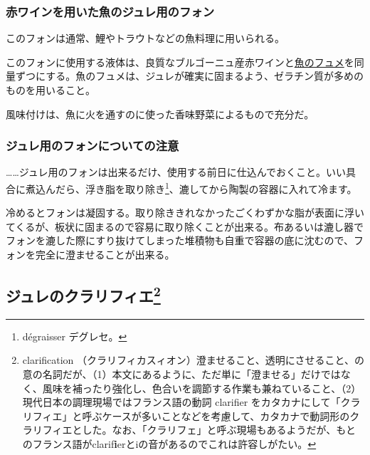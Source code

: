 \begin{recette}
\atoaki{}

\hypertarget{fonds-pour-gelee-de-poisson-au-vin-rouge}{%
\subsubsection{赤ワインを用いた魚のジュレ用のフォン}\label{fonds-pour-gelee-de-poisson-au-vin-rouge}}



このフォンは通常、鯉やトラウトなどの魚料理に用いられる。

このフォンに使用する液体は、良質なブルゴーニュ産赤ワインと\protect\hyperlink{fumet-de-poisson}{魚のフュメ}を同量ずつにする。魚のフュメは、ジュレが確実に固まるよう、ゼラチン質が多めのものを用いること。

風味付けは、魚に火を通すのに使った香味野菜によるもので充分だ。

\atoaki{}

\hypertarget{observation-sur-l-emplois-des-fonds-destines-aux-gelees}{%
\subsubsection{ジュレ用のフォンについての注意}\label{observation-sur-l-emplois-des-fonds-destines-aux-gelees}}

\ldots{}\ldots{}ジュレ用のフォンは出来るだけ、使用する前日に仕込んでおくこと。いい具合に煮込んだら、浮き脂を取り除き\footnote{dégraisser
  デグレセ。}、漉してから陶製の容器に入れて冷ます。

冷めるとフォンは凝固する。取り除ききれなかったごくわずかな脂が表面に浮いてくるが、板状に固まるので容易に取り除くことが出来る。布あるいは漉し器でフォンを漉した際にすり抜けてしまった堆積物も自重で容器の底に沈むので、フォンを完全に澄ませることが出来る。
\end{recette}
\newpage

\hypertarget{clarfication-des-gelees}{%
\subsection[ジュレのクラリフィエ]{\texorpdfstring{ジュレのクラリフィエ\footnote{clarification
  （クラリフィカスィオン）澄ませること、透明にさせること、の意の名詞だが、（1）本文にあるように、ただ単に「澄ませる」だけではなく、風味を補ったり強化し、色合いを調節する作業も兼ねていること、（2）現代日本の調理現場ではフランス語の動詞
  clarifier
  をカタカナにして「クラリフィエ」と呼ぶケースが多いことなどを考慮して、カタカナで動詞形のクラリフィエとした。なお、「クラリフェ」と呼ぶ現場もあるようだが、もとのフランス語がclarif\textbf{i}erとiの音があるのでこれは許容しがたい。}}{ジュレのクラリフィエ}}\label{clarfication-des-gelees}}

